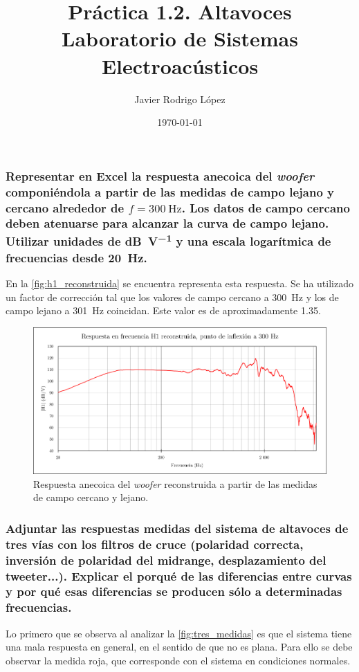 \documentclass[10pt]{article}
\title{\Huge Práctica 1.2. Altavoces \\\huge Laboratorio de Sistemas Electroacústicos}
\author{Javier Rodrigo López}
\date{\today}
\begin{document}
\maketitle

\subsubsection{Representar en Excel la respuesta anecoica del \textit{woofer} componiéndola a partir de las medidas de campo lejano y cercano alrededor de $f=\qty{300}{\hertz }$. Los datos de campo cercano deben atenuarse para alcanzar la curva de campo lejano. Utilizar unidades de \unit{\dB\per\volt} y una escala logarítmica de frecuencias desde \qty{20}{\hertz}.}

En la \autoref{fig:h1_reconstruida} se encuentra representa esta respuesta. Se ha utilizado un factor de corrección tal que los valores de campo cercano a \qty{300}{\hertz } y los de campo lejano a \qty{301}{\hertz } coincidan. Este valor es de aproximadamente \num{1.35}.

\begin{figure}[hbtp]
  \centering
  \includegraphics[width=0.8\linewidth]{h1_reconstruida.png}
  \caption{Respuesta anecoica del \textit{woofer} reconstruida a partir de las medidas de campo cercano y lejano.}
  \label{fig:h1_reconstruida}
\end{figure}

\subsubsection{Adjuntar las respuestas medidas del sistema de altavoces de tres vías con los filtros de cruce (polaridad correcta, inversión de polaridad del midrange, desplazamiento del tweeter...). Explicar el porqué de las diferencias entre curvas y por qué esas diferencias se producen sólo a determinadas frecuencias.}

Lo primero que se observa al analizar la \autoref{fig:tres_medidas} es que el sistema tiene una mala respuesta en general, en el sentido de que no es plana. Para ello se debe observar la medida roja, que corresponde con el sistema en condiciones normales.
\end{document}

